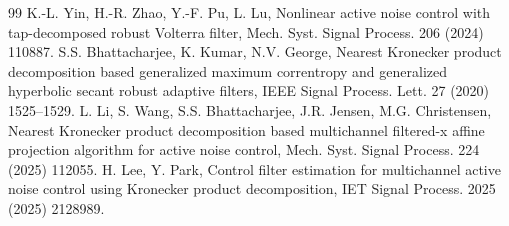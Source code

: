 \documentclass[preprint,12pt]{elsarticle}
\begin{document}
\begin{thebibliography}{99}
 K.-L. Yin, H.-R. Zhao, Y.-F. Pu, L. Lu, Nonlinear active noise control with tap-decomposed robust Volterra filter, Mech. Syst. Signal Process. 206 (2024) 110887.
 S.S. Bhattacharjee, K. Kumar, N.V. George, Nearest Kronecker product decomposition based generalized maximum correntropy and generalized hyperbolic secant robust adaptive filters, IEEE Signal Process. Lett. 27 (2020) 1525–1529.
 L. Li, S. Wang, S.S. Bhattacharjee, J.R. Jensen, M.G. Christensen, Nearest Kronecker product decomposition based multichannel filtered-x affine projection algorithm for active noise control, Mech. Syst. Signal Process. 224 (2025) 112055.
 H. Lee, Y. Park, Control filter estimation for multichannel active noise control using Kronecker product decomposition, IET Signal Process. 2025 (2025) 2128989.
\end{thebibliography}
\end{document}
